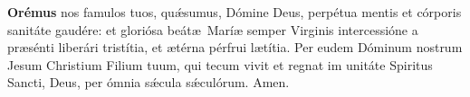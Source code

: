 \textbf{Orémus}
nos famulos tuos, qu{\'\ae}sumus, Dómine Deus, perpétua mentis et córporis sanitáte gaudére: et gloriósa beát{\ae}\ Marí{\ae} semper Virginis intercessióne
a pr{\ae}sénti liberári tristítia, et {\ae}térna pérfrui l{\ae}títia. Per eudem Dóminum nostrum Jesum Christium Filium tuum, qui tecum vivit et regnat im unitáte Spiritus Sancti,
Deus, per ómnia s{\'\ae}cula s{\'\ae}culórum. Amen.